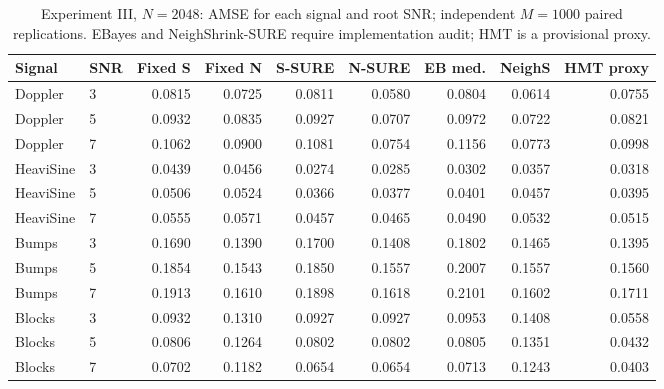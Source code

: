 \documentclass[11pt]{article}
\numberwithin{equation}{section}
\begin{document}
\begin{table}[H]
\centering\small
\caption{Experiment III, $N=2048$: AMSE for each signal and root SNR; independent $M=1000$ paired replications. EBayes and NeighShrink-SURE require implementation audit; HMT is a provisional proxy.}
\label{tab:s5-e3-amse-2048}
\setlength{\tabcolsep}{5pt}
\scriptsize
\setlength{\tabcolsep}{3pt}
\begin{tabular}{llrrrrrrr}
\toprule
Signal & SNR & Fixed S & Fixed N & S-SURE & N-SURE & EB med. & NeighS & HMT proxy \\
\midrule
Doppler & 3 & 0.0815 & 0.0725 & 0.0811 & 0.0580 & 0.0804 & 0.0614 & 0.0755 \\
Doppler & 5 & 0.0932 & 0.0835 & 0.0927 & 0.0707 & 0.0972 & 0.0722 & 0.0821 \\
Doppler & 7 & 0.1062 & 0.0900 & 0.1081 & 0.0754 & 0.1156 & 0.0773 & 0.0998 \\
HeaviSine & 3 & 0.0439 & 0.0456 & 0.0274 & 0.0285 & 0.0302 & 0.0357 & 0.0318 \\
HeaviSine & 5 & 0.0506 & 0.0524 & 0.0366 & 0.0377 & 0.0401 & 0.0457 & 0.0395 \\
HeaviSine & 7 & 0.0555 & 0.0571 & 0.0457 & 0.0465 & 0.0490 & 0.0532 & 0.0515 \\
Bumps & 3 & 0.1690 & 0.1390 & 0.1700 & 0.1408 & 0.1802 & 0.1465 & 0.1395 \\
Bumps & 5 & 0.1854 & 0.1543 & 0.1850 & 0.1557 & 0.2007 & 0.1557 & 0.1560 \\
Bumps & 7 & 0.1913 & 0.1610 & 0.1898 & 0.1618 & 0.2101 & 0.1602 & 0.1711 \\
Blocks & 3 & 0.0932 & 0.1310 & 0.0927 & 0.0927 & 0.0953 & 0.1408 & 0.0558 \\
Blocks & 5 & 0.0806 & 0.1264 & 0.0802 & 0.0802 & 0.0805 & 0.1351 & 0.0432 \\
Blocks & 7 & 0.0702 & 0.1182 & 0.0654 & 0.0654 & 0.0713 & 0.1243 & 0.0403 \\
\bottomrule
\end{tabular}
\end{table}
\end{document}
